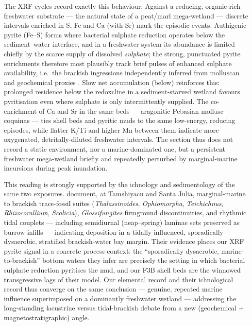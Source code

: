 \documentclass[11pt]{article}
\begin{document}
The XRF cycles record exactly this behaviour. Against a reducing, organic-rich
freshwater substrate --- the natural state of a peat/marl mega-wetland ---
discrete intervals enriched in S, Fe and Ca (with Sr) mark the episodic events.
Authigenic pyrite (Fe--S) forms where bacterial sulphate reduction operates
below the sediment--water interface, and in a freshwater system its abundance is
limited chiefly by the scarce supply of dissolved \emph{sulphate}; the strong,
punctuated pyrite enrichments therefore most plausibly track brief pulses of
enhanced sulphate availability, i.e.\ the brackish ingressions independently
inferred from molluscan and geochemical proxies \citep{Wesselingh2006}. Slow net
accumulation (below) reinforces this: prolonged residence below the redoxcline
in a sediment-starved wetland favours pyritisation even where sulphate is only
intermittently supplied. The co-enrichment of Ca and Sr in the same beds ---
aragonitic Pebasian mollusc coquinas --- ties shell beds and pyritic muds to the
same low-energy, reducing episodes, while flatter K/Ti and higher Mn between them
indicate more oxygenated, detritally-diluted freshwater intervals. The section
thus does not record a static environment, nor a marine-dominated one, but a
persistent freshwater mega-wetland briefly and repeatedly perturbed by
marginal-marine incursions during peak inundation.

This reading is strongly supported by the ichnology and sedimentology of the same
two exposures. \citet{Gingras2002} document, at Tamshiyacu and Santa Julia,
marginal-marine to brackish trace-fossil suites (\textit{Thalassinoides},
\textit{Ophiomorpha}, \textit{Teichichnus}, \textit{Rhizocorallium},
\textit{Scolicia}), \textit{Glossifungites} firmground discontinuities, and
rhythmic tidal couplets --- including semidiurnal (neap--spring) laminae sets
preserved as burrow infills --- indicating deposition in a tidally-influenced,
sporadically dysaerobic, stratified brackish-water bay margin. Their evidence
places our XRF pyrite signal in a concrete process context: the ``sporadically
dysaerobic, marine-to-brackish'' bottom waters they infer are precisely the
setting in which bacterial sulphate reduction pyritises the mud, and our F3B shell
beds are the winnowed transgressive lags of their model. Our elemental record and
their ichnological record thus converge on the same conclusion --- genuine,
repeated marine influence \citep[cf.][]{Rasanen1995} superimposed on a
dominantly freshwater wetland --- addressing the long-standing lacustrine
\citep{Wesselingh2006} versus tidal-brackish \citep{Gingras2002} debate from a new
(geochemical + magnetostratigraphic) angle.
\end{document}
